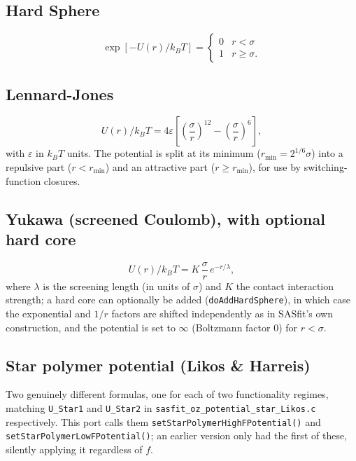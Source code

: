 \documentclass[11pt,a4paper]{article}
\newcommand{\code}[1]{\texttt{#1}}
\begin{document}
\subsection{Hard Sphere}
\begin{equation}
  \exp[-U(r)/k_BT] = \begin{cases} 0 & r<\sigma \\ 1 & r\ge\sigma. \end{cases}
\end{equation}

\subsection{Lennard-Jones}
\begin{equation}
  U(r)/k_BT = 4\varepsilon\left[\left(\frac{\sigma}{r}\right)^{12}-\left(\frac{\sigma}{r}\right)^{6}\right],
\end{equation}
with $\varepsilon$ in $k_BT$ units. The potential is split at its minimum
($r_{\min}=2^{1/6}\sigma$) into a repulsive part ($r<r_{\min}$) and an
attractive part ($r\ge r_{\min}$), for use by switching-function closures.

\subsection{Yukawa (screened Coulomb), with optional hard core}
\begin{equation}
  U(r)/k_BT = K\,\frac{\sigma}{r}\,e^{-r/\lambda},
\end{equation}
where $\lambda$ is the screening length (in units of $\sigma$) and $K$ the
contact interaction strength; a hard core can optionally be added
(\code{doAddHardSphere}), in which case the exponential and $1/r$ factors are
shifted independently as in SASfit's own construction, and the potential is
set to $\infty$ (Boltzmann factor 0) for $r<\sigma$.

\subsection{Star polymer potential (Likos \& Harreis) \cite{likos2002}}
\label{sec:starpolymer}
Two genuinely different formulas, one for each of two functionality
regimes, matching \code{U\_Star1} and \code{U\_Star2} in
\code{sasfit\_oz\_potential\_star\_Likos.c} respectively. This port calls
them \code{setStarPolymerHigh\-FPotential()} and
\code{setStarPolymerLow\-FPotential()}; an earlier version only had the
first of these, silently applying it regardless of $f$.
\end{document}
